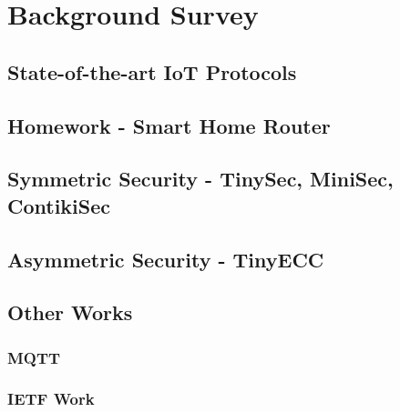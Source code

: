 \documentclass{mprop}
\begin{document}
\section{Background Survey}

\subsection{State-of-the-art IoT Protocols} %
\label{sub:state_of_the_art_iot_protocols}

\subsection{Homework - Smart Home Router} %
\label{sub:homework_smart_home_router}

\subsection{Symmetric Security - TinySec, MiniSec, ContikiSec} %
\label{sub:tinysec_minisec_contikisec}
\cite{TinySec, luk2007minisec, ContikiSec}

\subsection{Asymmetric Security - TinyECC} %
\label{sub:tinyecc}
\cite{TinyECC}

\subsection{Other Works} %
\label{sub:other_works}
\subsubsection{MQTT} %
\label{ssub:mqtt}

\subsubsection{IETF Work} %
\label{ssub:ietf_work}
\cite{IETF_COAP_HTTP, IETF_CORE}

\end{document}
